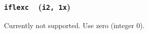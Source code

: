 \documentclass[letterpaper,11pt]{article}
\newcommand{\Oval}{\textsc{Oval}}
\newcommand{\Var}[2]{\texttt{#1}\ \  (\texttt{#2})}
\newlength{\Labelwidth}
\newcommand{\Entrylabel}[1]{\makebox[\Labelwidth][r]{\texttt{#1}}}
\newenvironment{Options}
{\begin{list}{}{%
\renewcommand{\makelabel}{\Entrylabel}%
\setlength{\leftmargin} {0.90in}%
\setlength{\rightmargin}{0.00in}%
\setlength{\labelsep}   {0.10in}%
\setlength{\labelwidth} {\Labelwidth}%
}}
{\end{list}}
\begin{document}
\subsubsection[\texttt{iflexc}]{\Var{iflexc}{i2, 1x}}\label{sec:iflexc}
Currently not supported.
Use zero (integer 0).
\end{document}
